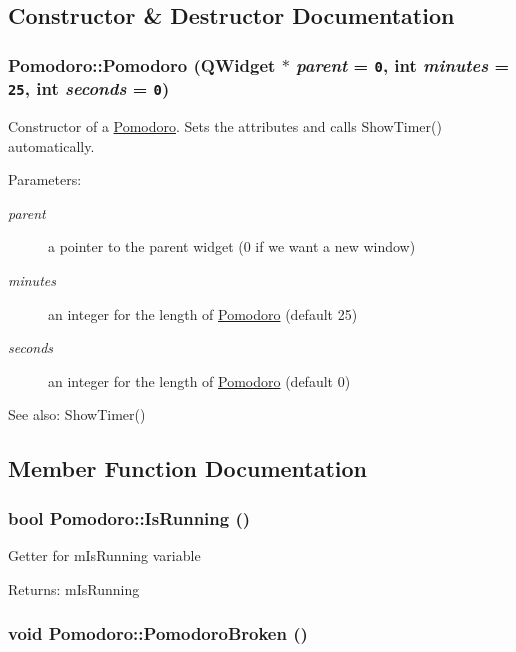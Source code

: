 \subsection{Constructor \& Destructor Documentation}
\hypertarget{classPomodoro_44fec950d9e8157f76fcae92004b084b}{
\subsubsection[{Pomodoro}]{\setlength{\rightskip}{0pt plus 5cm}Pomodoro::Pomodoro (QWidget $\ast$ {\em parent} = {\tt 0}, \/  int {\em minutes} = {\tt 25}, \/  int {\em seconds} = {\tt 0})}}
\label{classPomodoro_44fec950d9e8157f76fcae92004b084b}


Constructor of a \hyperlink{classPomodoro}{Pomodoro}. Sets the attributes and calls ShowTimer() automatically. \begin{Desc}
\item[Parameters:]
\begin{description}
\item[{\em parent}]a pointer to the parent widget (0 if we want a new window) \item[{\em minutes}]an integer for the length of \hyperlink{classPomodoro}{Pomodoro} (default 25) \item[{\em seconds}]an integer for the length of \hyperlink{classPomodoro}{Pomodoro} (default 0) \end{description}
\end{Desc}
\begin{Desc}
\item[See also:]ShowTimer() \end{Desc}


\subsection{Member Function Documentation}
\hypertarget{classPomodoro_61bb61d03bbdf837caf8174220405b7b}{
\subsubsection[{IsRunning}]{\setlength{\rightskip}{0pt plus 5cm}bool Pomodoro::IsRunning ()}}
\label{classPomodoro_61bb61d03bbdf837caf8174220405b7b}


Getter for mIsRunning variable \begin{Desc}
\item[Returns:]mIsRunning \end{Desc}
\hypertarget{classPomodoro_410db1b2329fac39b9788cdd5e5ea9b9}{
\subsubsection[{PomodoroBroken}]{\setlength{\rightskip}{0pt plus 5cm}void Pomodoro::PomodoroBroken ()}}
\label{classPomodoro_410db1b2329fac39b9788cdd5e5ea9b9}


